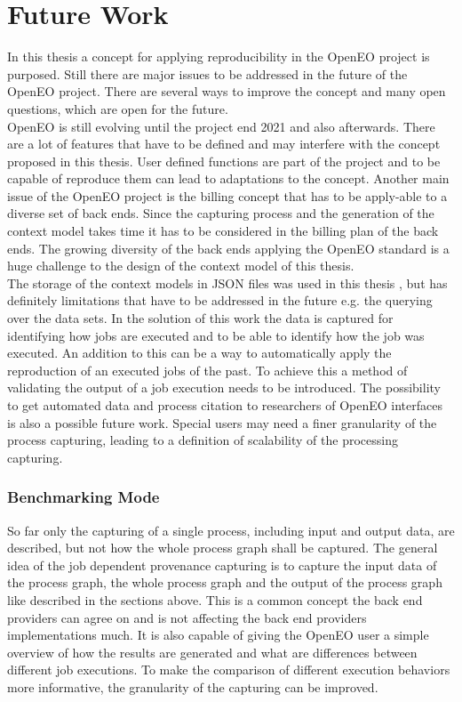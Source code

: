 \documentclass[draft,final]{vutinfth} %
\begin{document}
\section{Future Work}\label{FutureWork}
In this thesis a concept for applying reproducibility in the OpenEO project is purposed. Still there are major issues to be addressed in the future of the OpenEO project. There are several ways to improve the concept and many open questions, which are open for the future. \\
OpenEO is still evolving until the project end 2021 and also afterwards. There are a lot of features that have to be defined and may interfere with the concept proposed in this thesis. User defined functions are part of the project and to be capable of reproduce them can lead to adaptations to the concept. Another main issue of the OpenEO project is the billing concept that has to be apply-able to a diverse set of back ends. Since the capturing process and the generation of the context model takes time it has to be considered in the billing plan of the back ends. The growing diversity of the back ends applying the OpenEO standard is a huge challenge to the design of the context model of this thesis.\\
The storage of the context models in JSON files was used in this thesis , but has definitely limitations that have to be addressed in the future e.g. the querying over the data sets. 
In the solution of this work the data is captured for identifying how jobs are executed and to be able to identify how the job was executed. An addition to this can be a way to automatically apply the reproduction of an executed jobs of the past. To achieve this a method of validating the output of a job execution needs to be introduced. The possibility to get automated data and process citation to researchers of OpenEO interfaces is also a possible future work. Special users may need a finer granularity of the process capturing, leading to a definition of scalability of the processing capturing.      

\subsubsection{Benchmarking Mode}\label{Job:Benchmarking}

So far only the capturing of a single process, including input and output data, are described, but not how the whole process graph shall be captured. The general idea of the job dependent provenance capturing is to capture the input data of the process graph, the whole process graph and the output of the process graph like described in the sections above. This is a common concept the back end providers can agree on and is not affecting the back end providers implementations much. It is also capable of giving the OpenEO user a simple overview of how the results are generated and what are differences between different job executions. 
To make the comparison of different execution behaviors more informative, the granularity of the capturing can be improved. 
\end{document}
